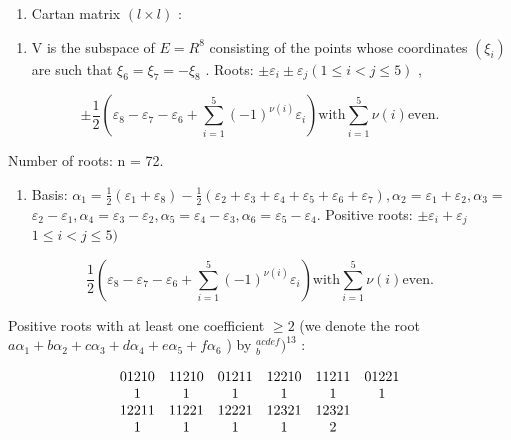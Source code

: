 \begin{enumerate}
\def\labelenumi{(\Roman{enumi})}
\setcounter{enumi}{12}
\tightlist
\item
  Cartan matrix \((l\times l)\) :
\end{enumerate}


\begin{enumerate}
\def\labelenumi{(\Roman{enumi})}
\tightlist
\item
  V is the subspace of \(E = R^{8}\) consisting of the points whose coordinates \((\xi_{i})\) are such that \(\xi_{6} = \xi_{7} = -\xi_{8}\) . Roots: \(\pm\varepsilon_{i} \pm \varepsilon_{j} (1 \leqslant i < j \leqslant 5)\) ,
\end{enumerate}

\[
\pm \frac {1}{2} (\varepsilon_ {8} - \varepsilon_ {7} - \varepsilon_ {6} + \sum_ {i = 1} ^ {5} (- 1) ^ {\nu (i)} \varepsilon_ {i}) \text {with} \sum_ {i = 1} ^ {5} \nu (i) \text {even.}
\]

Number of roots: n = 72.

\begin{enumerate}
\def\labelenumi{(\Roman{enumi})}
\setcounter{enumi}{1}
\tightlist
\item
Basis: \(\alpha_{1} = \frac{1}{2} (\varepsilon_{1} + \varepsilon_{8}) - \frac{1}{2} (\varepsilon_{2} + \varepsilon_{3} + \varepsilon_{4} + \varepsilon_{5} + \varepsilon_{6} + \varepsilon_{7}),\alpha_{2} = \varepsilon_{1} + \varepsilon_{2},\alpha_{3} =\) \(\varepsilon_2 - \varepsilon_1,\alpha_4 = \varepsilon_3 - \varepsilon_2,\alpha_5 = \varepsilon_4 - \varepsilon_3,\alpha_6 = \varepsilon_5 - \varepsilon_4.\) Positive roots: \(\pm \varepsilon_i + \varepsilon_j\) \(1\leqslant i <   j\leqslant 5)\)
\end{enumerate}

\[
\frac {1}{2} \left(\varepsilon_ {8} - \varepsilon_ {7} - \varepsilon_ {6} + \sum_ {i = 1} ^ {5} (- 1) ^ {\nu (i)} \varepsilon_ {i}\right) \text {with} \sum_ {i = 1} ^ {5} \nu (i) \text {even}.
\]

Positive roots with at least one coefficient \(\geqslant 2\) (we denote the root \(a\alpha_{1} + b\alpha_{2} + c\alpha_{3} + d\alpha_{4} + e\alpha_{5} + f\alpha_{6}\) ) by \({ }^{a c d e f}_{b})^{13}\) :

\[
\begin{array}{c c c c c c} 0   1   2   1   0 & 1   1   2   1   0 & 0   1   2   1   1 & 1   2   2   1   0 & 1   1   2   1   1 & 0   1   2   2   1 \\ 1 & 1 & 1 & 1 & 1 & 1 \\ 1   2   2   1   1 & 1   1   2   2   1 & 1   2   2   2   1 & 1   2   3   2   1 & 1   2   3   2   1 \\ 1 & 1 & 1 & 1 & 2 \end{array}
\]


